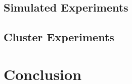 \documentclass{article}
\begin{document}
\subsection{Simulated Experiments}
\subsection{Cluster Experiments}

\section{Conclusion }











\end{document}

